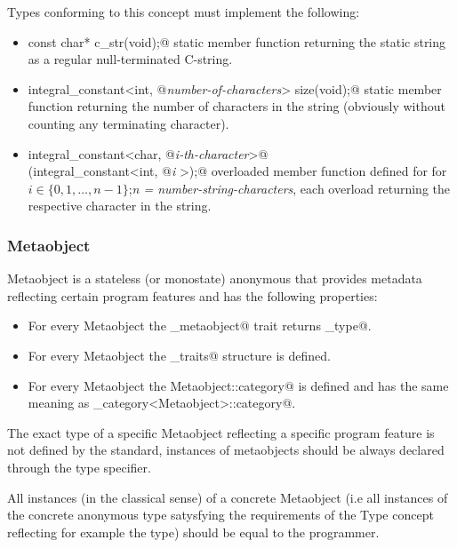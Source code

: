 Types conforming to this concept must implement the following:

\begin{itemize}
	\item{\verb@static const char* c_str(void);@} static member function returning the static
	string as a regular null-terminated C-string.

	\item{\verb@static integral_constant<int, @{\em number-of-characters}\verb@> size(void);@}
	static member function returning the number of characters in the string (obviously without
	counting any terminating character).

	\item{\verb@static integral_constant<char, @{\em i-th-character}\verb@>@\\
	\verb@at(integral_constant<int, @{\em i} \verb@>);@} overloaded member function defined for 
	for $i \in \{0, 1, \dots, n-1\}$;{\em n = number-string-characters},
	each overload returning the respective character in the string.
\end{itemize}

\subsubsection{Metaobject}

{\metaobject Metaobject} is a stateless (or monostate) anonymous \verb@struct@ that provides
metadata reflecting certain program features and has the following properties:

\begin{itemize}
\item For every {\metaobject Metaobject} the \verb@is_metaobject@ trait returns \verb@true_type@.
\item For every {\metaobject Metaobject} the \verb@metaobject_traits@ structure is defined.
\item For every {\metaobject Metaobject} the {\verb@typedef Metaobject::category@} is defined
and has the same meaning as \verb@metaobject_category<Metaobject>::category@.
\end{itemize}

The exact type of a specific {\metaobject Metaobject} reflecting a specific
program feature is not defined by the standard, instances of metaobjects
should be always declared through the \verb@auto@ type specifier.

All instances (in the classical sense) of a concrete {\metaobject Metaobject} (i.e all instances 
of the concrete anonymous type satysfying the requirements of the {\metaobject Type} concept
reflecting for example the \verb@int@ type) should be equal to
the programmer.

